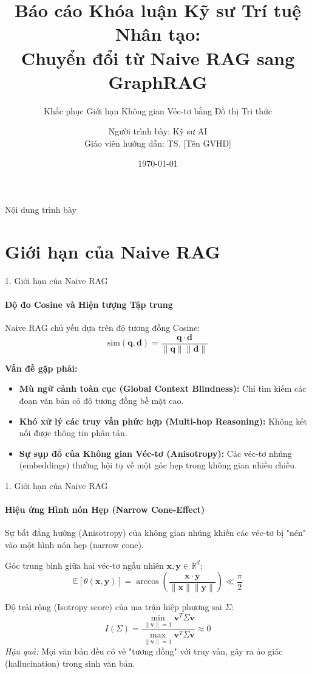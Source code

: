 \documentclass[aspectratio=169,xcolor=table]{beamer}
\title[Chuyển đổi từ Naive RAG sang GraphRAG]{Báo cáo Khóa luận Kỹ sư Trí tuệ Nhân tạo:\\Chuyển đổi từ Naive RAG sang GraphRAG}
\subtitle{Khắc phục Giới hạn Không gian Véc-tơ bằng Đồ thị Tri thức}
\author[Kỹ sư AI]{Người trình bày: Kỹ sư AI\\Giáo viên hướng dẫn: TS. [Tên GVHD]}
\institute[ĐH XYZ]{Trường Đại học [Tên Trường]\\Khoa Công nghệ Thông tin}
\date{\today}
\begin{document}
\begin{frame}
    \titlepage
\end{frame}

\begin{frame}{Nội dung trình bày}
    \tableofcontents
\end{frame}

\section{Giới hạn của Naive RAG}

\begin{frame}{1. Giới hạn của Naive RAG}
    \framesubtitle{Độ đo Cosine và Hiện tượng Tập trung}
    Naive RAG chủ yếu dựa trên độ tương đồng Cosine:
    \begin{equation}
        \text{sim}(\mathbf{q}, \mathbf{d}) = \frac{\mathbf{q} \cdot \mathbf{d}}{\|\mathbf{q}\| \|\mathbf{d}\|}
    \end{equation}
    
    \textbf{Vấn đề gặp phải:}
    \begin{itemize}
        \item \textbf{Mù ngữ cảnh toàn cục (Global Context Blindness):} Chỉ tìm kiếm các đoạn văn bản có độ tương đồng bề mặt cao.
        \item \textbf{Khó xử lý các truy vấn phức hợp (Multi-hop Reasoning):} Không kết nối được thông tin phân tán.
        \item \textbf{Sự sụp đổ của Không gian Véc-tơ (Anisotropy):} Các véc-tơ nhúng (embeddings) thường hội tụ về một góc hẹp trong không gian nhiều chiều.
    \end{itemize}
\end{frame}

\begin{frame}{1. Giới hạn của Naive RAG}
    \framesubtitle{Hiệu ứng Hình nón Hẹp (Narrow Cone-Effect)}
    Sự bất đẳng hướng (Anisotropy) của không gian nhúng khiến các véc-tơ bị "nén" vào một hình nón hẹp (narrow cone).
    
    Góc trung bình giữa hai véc-tơ ngẫu nhiên $\mathbf{x}, \mathbf{y} \in \mathbb{R}^d$:
    \begin{equation}
        \mathbb{E}[\theta(\mathbf{x}, \mathbf{y})] = \arccos\left(\frac{\mathbf{x} \cdot \mathbf{y}}{\|\mathbf{x}\| \|\mathbf{y}\|}\right) \ll \frac{\pi}{2}
    \end{equation}
    
    Độ trải rộng (Isotropy score) của ma trận hiệp phương sai $\Sigma$:
    \begin{equation}
        I(\Sigma) = \frac{\min_{\|\mathbf{v}\|=1} \mathbf{v}^T \Sigma \mathbf{v}}{\max_{\|\mathbf{v}\|=1} \mathbf{v}^T \Sigma \mathbf{v}} \approx 0
    \end{equation}
    \textit{Hậu quả:} Mọi văn bản đều có vẻ "tương đồng" với truy vấn, gây ra ảo giác (hallucination) trong sinh văn bản.
\end{frame}
\end{document}
